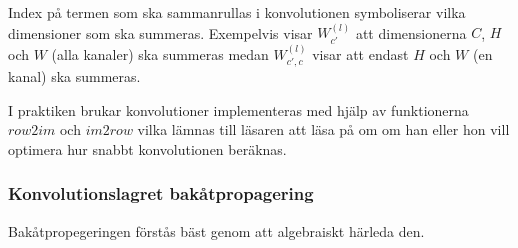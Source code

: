 \documentclass[a4paper,11pt,twoside]{article}
\begin{document}
Index på termen som ska sammanrullas i konvolutionen symboliserar vilka dimensioner som ska summeras. Exempelvis visar $W^{(l)}_{c'}$ att dimensionerna $C$, $H$ och $W$ (alla kanaler) ska summeras medan  $W^{(l)}_{c', c}$ visar att endast $H$ och $W$ (en kanal) ska summeras.

I praktiken brukar konvolutioner implementeras med hjälp av funktionerna $row2im$ och $im2row$ vilka lämnas till läsaren att läsa på om om han eller hon vill optimera hur snabbt konvolutionen beräknas. \cite{cs231n} \cite{convmath} \cite{convarithmetic}

\subsubsection{Konvolutionslagret bakåtpropagering}
Bakåtpropegeringen förstås bäst genom att algebraiskt härleda den. 
\end{document}
